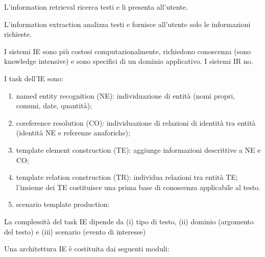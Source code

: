 L'information retrieval ricerca testi e li presenta all'utente.

L'information extraction analizza testi e fornisce all'utente solo le informazioni richieste.

I sistemi IE sono più costosi computazionalmente,  richiedono conoscenza (sono knowledge intensive) e sono specifici di un dominio applicativo. I sistemi IR no.

I task dell'IE sono:

\begin{enumerate}
	
	\item named entity recognition (NE): individuazione di entità (nomi propri, comuni, date, quantità);
	
	\item coreference resolution (CO): individuazione di relazioni di identità tra entità (identità NE e referenze anaforiche);
	
	\item template element construction (TE): aggiunge informazioni descrittive a NE e CO; 
	
	\item template relation construction (TR): individua relazioni tra entità TE; l'insieme dei TE costituisce una prima base di conoscenza applicabile al testo.
	
	\item scenario template production:
	
\end{enumerate}

La complessità del task IE dipende da (i) tipo di testo, (ii) dominio (argomento del testo) e (iii) scenario (evento di interesse)

Una architettura IE è costituita dai seguenti moduli:

